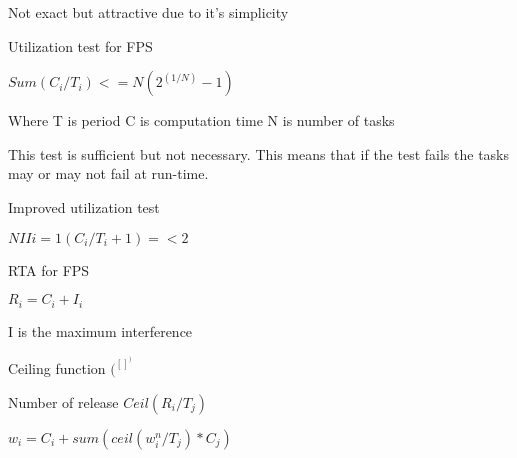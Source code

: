 Not exact but attractive due to it's simplicity

Utilization test for FPS

$ Sum(C_i/T_i) <= N(2^(1/N) - 1) $

Where T is period
C is computation time
N is number of tasks

This test is sufficient but not necessary. This means that if the test fails the tasks may or may not fail at run-time.

Improved utilization test

$ N II i=1 (C_i/T_i + 1) =< 2$ 

RTA for FPS

$R_i = C_i + I_i $

I is the maximum interference

Ceiling function $(^[]^)$

Number of release $Ceil(R_i/T_j)$


$ w_i = C_i + sum(ceil(w_i^n/T_j)*C_j)$ 

